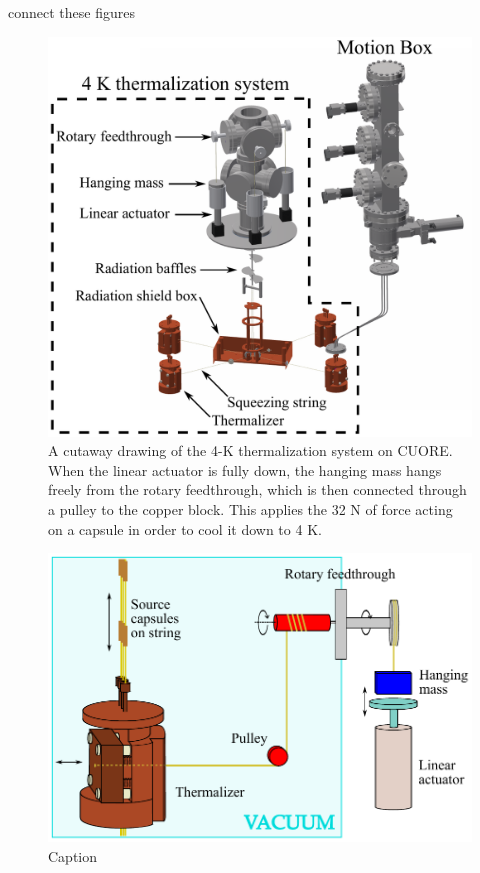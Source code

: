 \color{red}connect these figures \color{black}
\begin{figure}[htbp]
    \centering
    \includegraphics[width=0.8\linewidth]{Figures/thermalization_system_labeled.pdf}
    \caption[A cutaway drawing of the 4-K thermalization system on CUORE.]
    {A cutaway drawing of the 4-K thermalization system on CUORE.
    When the linear actuator is fully down, the hanging mass hangs freely from the rotary feedthrough, which is then connected through a pulley to the copper block.
    This applies the 32 N of force acting on a capsule in order to cool it down to 4 K.}
    \label{fig:DCS_4K_thermalizer}
\end{figure}

\begin{figure}[htbp]
    \centering
    \includegraphics[width=0.8\linewidth]{Figures/Thermalizer_schematic_labeled.pdf}
    \caption{Caption}
    \label{fig:DCS_4K_schematic}
\end{figure}


